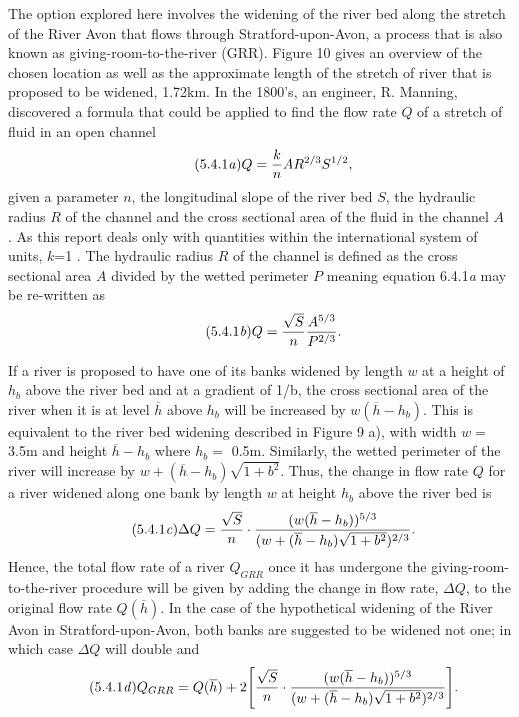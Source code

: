 \documentclass[11pt,a4paper]{article}
\begin{document}
\noindent The option explored here involves the widening of the river bed along the stretch of the River Avon that flows through Stratford-upon-Avon, a process that is also known as giving-room-to-the-river (GRR). Figure 10 gives an overview of the chosen location as well as the approximate length of the stretch of river that is proposed to be widened, 1.72km. In the 1800's, an engineer, R. Manning, discovered a formula that could be applied to find the flow rate $Q$ of a stretch of fluid in an open channel 
\begin{equation}\tag{5.4.1\textit{a}}
Q=\frac{k}{n}AR^{2/3}S^{1/2},
\end{equation}
given a parameter $n$, the longitudinal slope of the river bed $S$, the hydraulic radius $R$ of the channel and the cross sectional area of the fluid in the channel $A$ \cite{manning}. As this report deals only with quantities within the international system of units, $k$=1 \cite{manning}. The hydraulic radius $R$ of the channel is defined as the cross sectional area $A$  divided by the wetted perimeter $P$ meaning equation 6.4.1\textit{a} may be re-written as
\begin{equation}\tag{5.4.1\textit{b}}
Q=\frac{\sqrt{S}}{n}\frac{A^{5/3}}{P^{2/3}}.
\end{equation}

If a river is proposed to have one of its banks widened by length $w$ at a height of $h_b$ above the river bed and at a gradient of 1/b, the cross sectional area of the river when it is at level $\overline{h}$ above $h_b$ will be increased by $w(\overline{h}-h_b)$. This is equivalent to the river bed widening described in Figure 9 a), with width $w=$ 3.5m and height $\overline{h}-h_b$ where $h_b=$ 0.5m. Similarly, the wetted perimeter of the river will increase by $w+(\overline{h}-h_b)\sqrt{1+b^2}$. Thus, the change in flow rate $Q$ for a river widened along one bank by length $w$ at height $h_b$ above the river bed is
\begin{equation}\tag{5.4.1\textit{c}}
\Delta Q=\frac{\sqrt{S}}{n}\cdot\frac{(w(\overline{h}-h_b))^{5/3}}{(w+(\overline{h}-h_b)\sqrt{1+b^2})^{2/3}}.
\end{equation}
Hence, the total flow rate of a river $Q_{GRR}$ once it has undergone the giving-room-to-the-river procedure will be given by adding the change in flow rate, $\Delta Q$, to the original flow rate $Q(\overline{h})$. In the case of the hypothetical widening of the River Avon in Stratford-upon-Avon, both banks are suggested to be widened not one{;} in which case $\Delta Q$ will double and
\begin{equation}\tag{5.4.1\textit{d}}
Q_{GRR}=Q(\overline{h})+2\Bigg[\frac{\sqrt{S}}{n}\cdot\frac{(w(\overline{h}-h_b))^{5/3}}{(w+(\overline{h}-h_b)\sqrt{1+b^2})^{2/3}}\Bigg].
\end{equation}
\end{document}
